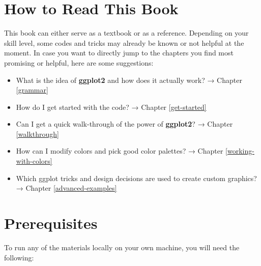 \documentclass[
]{krantz}
\providecommand{\tightlist}{%
  \setlength{\itemsep}{0pt}\setlength{\parskip}{0pt}}
\begin{document}
\hypertarget{how-to-read-this-book}{%
\section*{How to Read This Book}\label{how-to-read-this-book}}


This book can either serve as a textbook or as a reference. Depending on your skill level, some codes and tricks may already be known or not helpful at the moment. In case you want to directly jump to the chapters you find most promising or helpful, here are some suggestions:

\begin{itemize}
\tightlist
\item
  What is the idea of \textbf{ggplot2} and how does it actually work? → Chapter \ref{grammar}
\item
  How do I get started with the code? → Chapter \ref{get-started}
\item
  Can I get a quick walk-through of the power of \textbf{ggplot2}? → Chapter \ref{walkthrough}
\item
  How can I modify colors and pick good color palettes? → Chapter \ref{working-with-colors}
\item
  Which ggplot tricks and design decisions are used to create custom graphics? → Chapter \ref{advanced-examples}
\end{itemize}

\hypertarget{prerequisites}{%
\section*{Prerequisites}\label{prerequisites}}


To run any of the materials locally on your own machine, you will need the following:
\end{document}
